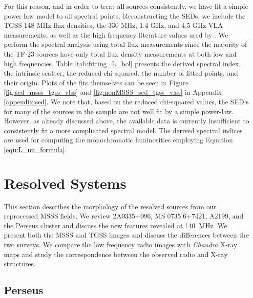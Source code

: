 \documentclass{aa}  %
\begin{document}
For this reason, and in order to treat all sources consistently, we have fit a simple power law model to all spectral points. Reconstructing the SEDs, we include the TGSS 148 MHz flux densities, the 330 MHz, 1.4 GHz, and 4.5 GHz VLA measurements, as well as the high frequency literature values used by \cite{Birzan2008}. We perform the spectral analysis using total flux measurements since the majority of the TF-23 sources have only total flux density measurements at both low and high frequencies.
Table \ref{tab:fitting_L_bol} presents the derived spectral index, the intrinsic scatter, the reduced chi-squared, the number of fitted points, and their origin.
Plots of the fits themselves can be seen in Figure \ref{fig:sed_msss_tgss_vlss} and \ref{fig:nonMSSS_sed_tgss_vlss} in Appendix \ref{appendix:sed}. We note that, based on the reduced chi-squared values, the SED's for many of the sources in the sample are not well fit by a simple power-law. However, as already discussed above, the available data is currently insufficient to consistently fit a more complicated spectral model. The derived spectral indices are used for computing the monochromatic luminosities employing Equation \ref{equ:L_nu_formula}.







\section{Resolved Systems}
\label{sec:resolved}

This section describes the morphology of the resolved sources from our reprocessed MSSS fields. 
We review 2A0335+096, MS 0735.6+7421, A2199, and the Perseus cluster and discuss the new features revealed at 140~MHz. 
We present both the MSSS and TGSS images and discuss the differences between the two surveys.
We compare the low frequency radio images with \textit{Chandra} X-ray maps and study the correspondence between the observed radio and X-ray structures.


\subsection{Perseus}
\end{document}
